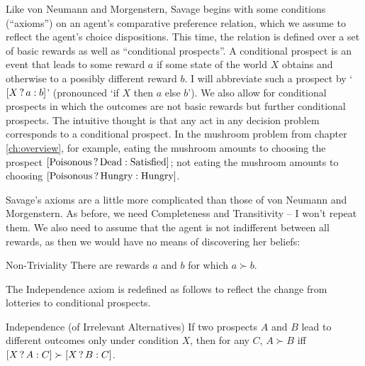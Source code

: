 Like von Neumann and Morgenstern, Savage begins with some conditions
(``axioms'') on an agent's comparative preference relation, which we
assume to reflect the agent's choice dispositions. This time, the
relation is defined over a set of basic rewards as well as
``conditional prospects''. A conditional prospect is an event that
leads to some reward $a$ if some state of the world $X$ obtains and
otherwise to a possibly different reward $b$. I will abbreviate such a
prospect by `$[X\,?\, a :b]$' (pronounced `if $X$ then $a$ else $b$').
We also allow for conditional prospects in which the outcomes are not
basic rewards but further conditional prospects. The intuitive thought
is that any act in any decision problem corresponds to a conditional
prospect. In the mushroom problem from chapter \ref{ch:overview}, for
example, eating the mushroom amounts to choosing the prospect
$[\text{Poisonous}\,?\, \text{Dead} :\text{Satisfied}]$; not eating
the mushroom amounts to choosing
$[\text{Poisonous}\,?\, \text{Hungry} :\text{Hungry}]$.

Savage's axioms are a little more complicated than those of von
Neumann and Morgenstern. As before, we need Completeness and
Transitivity -- I won't repeat them. We also need to assume that the
agent is not indifferent between all rewards, as then we would have no
means of discovering her beliefs:
%
\begin{genericthm}{Non-Triviality}
  There are rewards $a$ and $b$ for which $a\succ b$.
\end{genericthm}

The Independence axiom is redefined as follows to reflect the change
from lotteries to conditional prospects.
%
%
\begin{genericthm}{Independence (of Irrelevant Alternatives)} 
  If two prospects $A$ and $B$ lead to different outcomes only under
  condition $X$, then for any $C$, $A \succ B$ iff $[X\,?\, A :C]
  \succ [X\,?\, B :C]$.
\end{genericthm}

